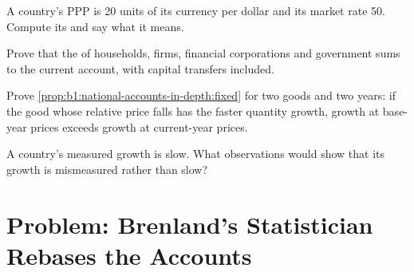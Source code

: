 \begin{exercise}[$\star\star$]\label{exo:b1:national-accounts-in-depth:pli-ex}
A country's PPP is 20 units of its currency per dollar and its market rate
50. Compute its  and say what it means.
\end{exercise}

\begin{exercise}[$\star\star\star$]\label{exo:b1:national-accounts-in-depth:sum}
Prove that the  of households, firms, financial corporations
and government sums to the current account, with capital transfers
included.
\end{exercise}

\begin{exercise}[$\star\star\star$]\label{exo:b1:national-accounts-in-depth:fixed-base}
Prove \cref{prop:b1:national-accounts-in-depth:fixed} for two goods and two
years: if the good whose relative price falls has the faster quantity
growth, growth at base-year prices exceeds growth at current-year prices.
\end{exercise}

\begin{exercise}[$\star\star\star$]\label{exo:b1:national-accounts-in-depth:refute}
A country's measured growth is slow. What observations would show that
its growth is mismeasured rather than slow?
\end{exercise}

\section{Problem: Brenland's Statistician Rebases the Accounts}\label{sec:b1:national-accounts-in-depth:problem}

